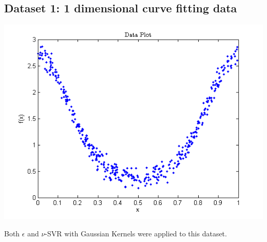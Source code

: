 \documentclass{article}
\begin{document}
\subsection{Dataset 1: 1 dimensional curve fitting data}
\begin{center}
\includegraphics[scale=1]{Regression/univar}
\end{center}
Both $\epsilon$ and $\nu$-SVR with Gaussian Kernels were applied to this dataset.
\end{document}
